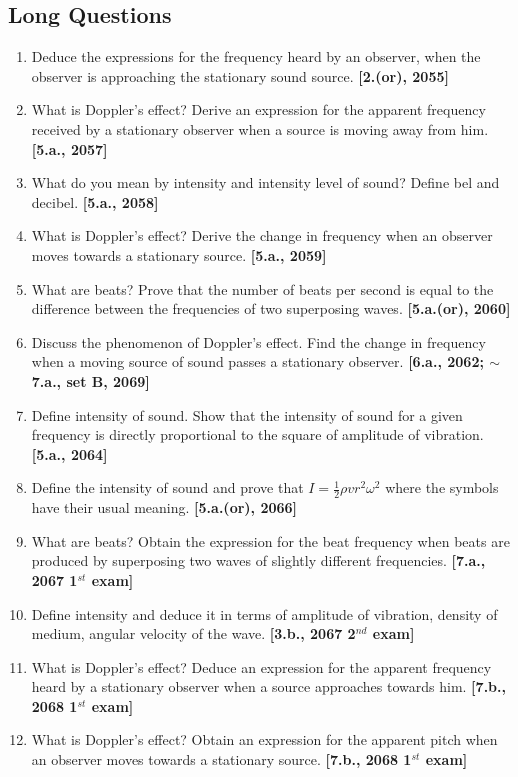 \documentclass[a4paper,10pt]{report}
\begin{document}
 \subsection{Long Questions}
  \begin{enumerate}
   \item Deduce the expressions for the frequency heard by an observer, when the observer is approaching the stationary sound
    source. \textbf{[2.(or), 2055]}
   \item What is Doppler's effect? Derive an expression for the apparent frequency received by a stationary observer when a 
    source is moving away from him. \textbf{[5.a., 2057]}
   \item What do you mean by intensity and intensity level of sound? Define bel and decibel. \textbf{[5.a., 2058]}
   \item What is Doppler's effect? Derive the change in frequency when an observer moves towards a stationary source. \textbf{
    [5.a., 2059]}
   \item What are beats? Prove that the number of beats per second is equal to the difference between the frequencies of two 
    superposing waves. \textbf{[5.a.(or), 2060]}
   \item Discuss the phenomenon of Doppler's effect. Find the change in frequency when a moving source of sound passes a stationary
    observer. \textbf{[6.a., 2062; $\sim$7.a., set B, 2069]}
   \item Define intensity of sound. Show that the intensity of sound for a given frequency is directly proportional to the square
    of amplitude of vibration. \textbf{[5.a., 2064]}
   \item Define the intensity of sound and prove that $I = \frac 12 \rho vr^2 \omega^2$ where the symbols have their usual meaning.
    \textbf{[5.a.(or), 2066]}
   \item What are beats? Obtain the expression for the beat frequency when beats are produced by superposing two waves of slightly
    different frequencies. \textbf{[7.a., 2067 1$^{st}$ exam]}
   \item Define intensity and deduce it in terms of amplitude of vibration, density of medium, angular velocity of the wave. 
    \textbf{[3.b., 2067 2$^{nd}$ exam]}
   \item What is Doppler's effect? Deduce an expression for the apparent frequency heard by a stationary observer when a source
    approaches towards him. \textbf{[7.b., 2068 1$^{st}$ exam]}
   \item What is Doppler's effect? Obtain an expression for the apparent pitch when an observer moves towards a stationary source.
    \textbf{[7.b., 2068 1$^{st}$ exam]}
  \end{enumerate}
\end{document}
